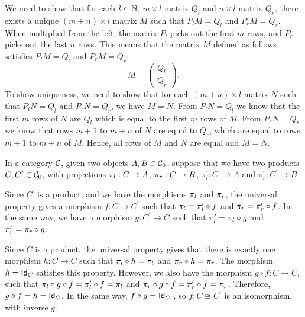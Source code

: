 \begin{solution}
\begin{enumerate}
		We need to show that for each $l \in \NN$, $m \times l$ matrix $Q_l$ and $n \times l$ matrix $Q_r$, there exists a unique $(m + n) \times l$ matrix $M$ such that $P_l M = Q_l$ and $P_r M = Q_r$. 
		When multiplied from the left, the matrix $P_l$ picks out the first $m$ rows, and $P_r$ picks out the last $n$ rows. This means that the matrix $M$ defined as follows satisfies $P_l M = Q_l$ and $P_r M = Q_r$:
		\[
		M = 
		\begin{pmatrix}
			Q_l \\
			Q_r
		\end{pmatrix}.
		\]
		To show uniqueness, we need to show that for each $(m+n) \times l$ matrix $N$ such that $P_l N = Q_l$ and $P_r N = Q_r$, we have $M=N$.
		From $P_l N = Q_l$ we know that the first $m$ rows of $N$ are $Q_l$ which is equal to the first $m$ rows of $M$. From $P_r N = Q_r$ we know that rows $m+1$ to $m+n$ of $N$ are equal to $Q_r$, which are equal to rows $m+1$ to $m+n$ of $M$. Hence, all rows of $M$ and $N$ are equal and $M =N$.
	\end{enumerate}
\end{solution}

\begin{solution}\label{sol:product-unique}
	In a category $ \CC $, given two objects $ A, B \in \Ob \CC $, suppose that we have two products $ C, C^\prime \in \Ob \CC $, with projections $ \projl: C \to A $, $ \projr: C \to B $, $ \pi^\prime_l: C^\prime \to A $ and $ \pi^\prime_r: C^\prime \to B $.

	Since $ C^\prime $ is a product, and we have the morphisms $ \projl $ and $ \projr $, the universal property gives a morphism $ f: C \to C^\prime $ such that $ \projl = \pi^\prime_l \circ f $ and $ \projr = \pi^\prime_r \circ f $. In the same way, we have a morphism $ g: C^\prime \to C $ such that $ \pi^\prime_l = \projl \circ g $ and $ \pi^\prime_r = \projr \circ g $.
	
	Since $ C $ is a product, the universal property gives that there is exactly one morphism $ h: C \to C $ such that $ \projl \circ h = \projl $ and $ \projr \circ h = \projr $. The morphism $ h = \Id[C] $ satisfies this property. However, we also have the morphism $ g \circ f: C \to C $, such that $ \projl \circ g \circ f = \pi^\prime_l \circ f = \projl $ and $ \projr \circ g \circ f = \pi^\prime_r \circ f = \projr $. Therefore, $ g \circ f = h = \Id[C] $. In the same way, $ f \circ g = \Id[C^\prime] $, so $ f: C \cong C^\prime $ is an isomorphism, with inverse $ g $.
\end{solution}

